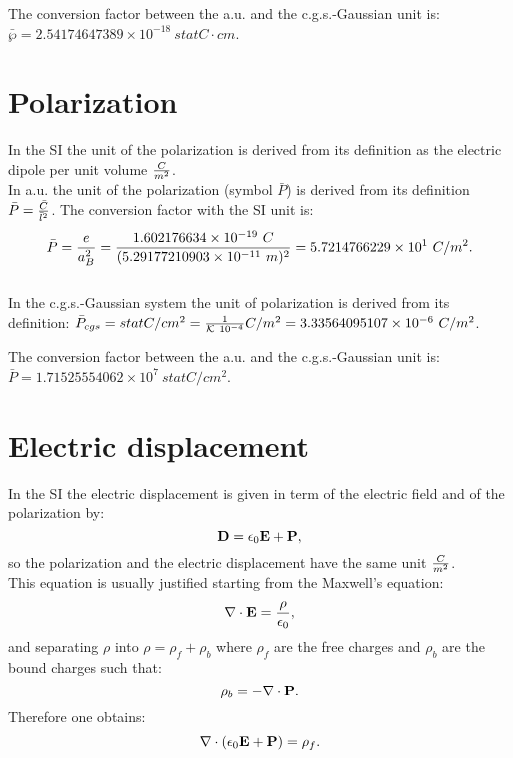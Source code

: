 \documentclass[12pt,a4paper]{article}
\def\barl{5.29177210903\times 10^{-11}}
\def\barc{1.602176634\times 10^{-19}}
\def\barpolar{5.7214766229\times 10^{1}}
\def\polartopolar{3.33564095107\times 10^{-6}}
\def\bardipcgs{2.54174647389\times 10^{-18}}
\def\barpolarcgs{1.71525554062\times 10^{7}}
\begin{document}
{\color{green} 
The conversion factor between the a.u. and the c.g.s.-Gaussian unit is: 
$\bar \wp = \bardipcgs \ statC\cdot cm$.
}

\newpage
\section{\color{coral}Polarization}
In the SI the unit of the polarization is derived from its definition as
the electric dipole per unit volume ${C \over m^2}$. 
\\

{\color{web-blue} In a.u. the unit of the polarization (symbol $\bar P$) 
is derived from its definition $\bar P={\bar C \over \bar l^2}$. The 
conversion factor with the SI unit is:
\begin{equation}
\bar P = {e \over a_B^2} =
{\barc\ C \over (\barl\ m)^2} = \barpolar\ C/m^2.
\end{equation}
}
\\

{\color{orange} In the c.g.s.-Gaussian system the unit of polarization
is derived from its definition:
$\bar P_{cgs}=statC/cm^2 = {1\over \mathcal{K}\ 10^{-4}} C/m^2=\polartopolar\ C/m^2$. 
\\
}

{\color{green} 
The conversion factor between the a.u. and the c.g.s.-Gaussian unit is: 
$\bar P = \barpolarcgs \ statC/cm^2$.
}

\newpage
\section{\color{coral}Electric displacement}
In the SI the electric displacement is given in term of the
electric field and of the polarization by:
\begin{equation}
{\bf D}=\epsilon_0 {\bf E} + {\bf P},
\label{eldisp}
\end{equation}
so the polarization and the electric displacement have the same
unit ${C \over m^2}$. \\
This equation is usually justified starting from
the Maxwell's equation:
\begin{equation}
\nabla \cdot {\bf E} = {\rho \over \epsilon_0},
\end{equation}
and separating $\rho$ into $\rho=\rho_f + \rho_b$ where
$\rho_f$ are the free charges and $\rho_b$ are the 
bound charges such that:
\begin{equation}
\rho_b=-\nabla \cdot {\bf P}.
\end{equation}
Therefore one obtains:
\begin{equation}
\nabla \cdot (\epsilon_0 {\bf E}+ {\bf P})=\rho_f. 
\end{equation}
\\
\end{document}
